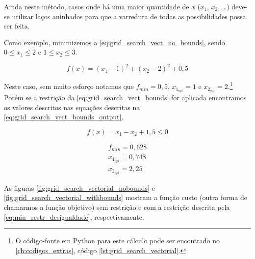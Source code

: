 Ainda neste método, casos onde há uma maior quantidade de $x$ ($x_1$, $x_2$, \dots)
deve-se utilizar laços aninhados para que a varredura de todas as possibilidades
possa ser feita. 

Como exemplo, minimizemos a \cref{eq:grid_search_vect_no_bounds}, sendo
$0 \leq x_1 \leq 2$ e $1 \leq x_2 \leq 3$.

\begin{equation}
	\label{eq:grid_search_vect_no_bounds}
	f(x) = (x_1 - 1)^2 + (x_2 - 2)^2 + 0,5
\end{equation}

Neste caso, sem muito esforço notamos que
$f_{min} = 0,5$, $x_{1_{opt}} = 1$ e $x_{2_{opt}} = 2$.\footnote{
	O código-fonte em Python para este cálculo pode ser encontrado no
	\cref{ch:codigos_extras}, código \ref{lst:grid_search_vectorial}.}
Porém se a restrição da \cref{eq:grid_search_vect_bounds} for aplicada
encontramos os valores descritos nas equações descritas na \cref{eq:grid_search_vect_bounds_output}.

\begin{equation}
	\label{eq:grid_search_vect_bounds}
	f(x) = x_1 - x_2 + 1,5 \leq 0
\end{equation}


\begin{equation}
	\label{eq:grid_search_vect_bounds_output}
	\begin{aligned}
		f_{min} = 0,628 \\
		x_{1_{opt}} = 0,748 \\
		x_{2_{opt}} = 2,25
	\end{aligned}
\end{equation}

As figuras \ref{fig:grid_search_vectorial_nobounds} e \ref{fig:grid_search_vectorial_withbounds}
mostram a função custo (outra forma de chamarmos a função objetivo) sem restrição e com a
restrição descrita pela \cref{eq:min_restr_desigualdade}, respectivamente.


